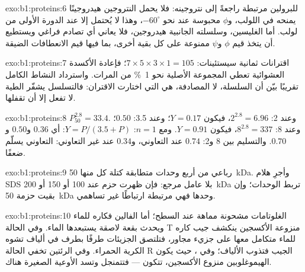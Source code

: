 \begin{solution}{exo:b1:proteins:6}
 للبرولين مرتبطة راجعةً إلى نتروجينه: فلا يحمل
النتروجين هيدروجينًا يمنحه  في اللولب، و$\phi$
محبوسة عند نحو $-60^\circ$، وهذا لا يُحتمل إلا عند الدورة الأولى من
لولب. أما الغليسين، وسلسلته الجانبية هيدروجين، فلا يعاني أي تصادم
فراغي ويستطيع أن يتخذ قيم $\phi$ و$\psi$ ممنوعة على كل بقية أخرى، بما
فيها قيم الانعطافات الضيقة.
\end{solution}

\begin{solution}{exo:b1:proteins:7}
اقترانات ثمانية سيستئينات: $7\times 5\times 3\times 1 = 105$؛ فإعادة
الأكسدة العشوائية تعطي المجموعة الأصلية نحو \qty{1}{\%} من المرات.
واسترداد النشاط الكامل تقريبًا بيّن أن السلسلة، لا المصادفة، هي التي
اختارت الاقتران: فالتسلسل يشفّر الطية  لا تفعل
إلا أن تقفلها.
\end{solution}

\begin{solution}{exo:b1:proteins:8}
$P_{50}^{2.8} = 33.4$. وعند 2: $2^{2.8} = 6.96$، فيكون $Y = 0.17$؛
وعند 3.5: $0.50$؛ وعند 8: $8^{2.8} = 337$، فيكون $Y = 0.91$. ومع
$n = 1$: $Y =
P/(3.5 + P)$: أي $0.36$ و$0.50$ و$0.70$. والتسليم بين
8 و2: $0.74$ عند التعاوني، و$0.34$ عند غير التعاوني: 
التعاوني يسلّم ضعفًا.
\end{solution}

\begin{solution}{exo:b1:proteins:9}
رباعي من أربع وحدات متطابقة كتلة كل منها \qty{50}{kDa}. وأجرِ هلام
SDS بلا عامل مرجع: فإن ظهرت حزم عند 100 أو 150 أو \qty{200}{kDa}
 تربط الوحدات؛ وإن بقيت حزمة \qty{50}{kDa}
وحدها فهي مرتبطة ارتباطًا غير تساهمي.
\end{solution}

\begin{solution}{exo:b1:proteins:10}
الغلوتامات مشحونة مماهة عند السطح؛ أما الفالين فكاره للماء ويحدث بقعة
لاصقة يستبعدها الماء. وفي الحالة T منزوعة الأكسجين ينكشف جيب كاره
للماء متكامل معها على جزيء مجاور، فتلتصق الجزيئات طرفًا بطرف في ألياف
تشوه الكرية الحمراء. وفي الرئتين تخفي الحالة R الجيب فتذوب الألياف؛
وفي ، حيث يكون الهيموغلوبين منزوع الأكسجين، تتكون --- فتتمنجل
 وتسد الأوعية الصغيرة هناك.
\end{solution}


